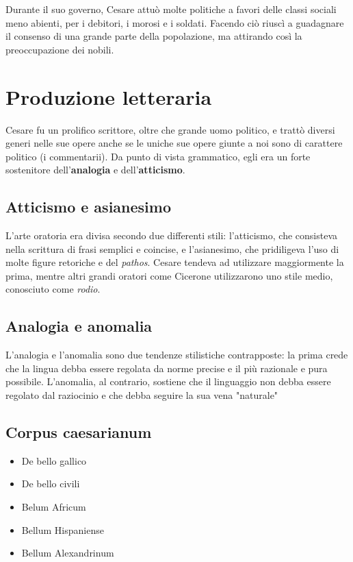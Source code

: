 \documentclass[10pt,a4paper]{article}
\begin{document}
Durante il suo governo, Cesare attuò molte politiche a favori delle classi sociali meno abienti, per i debitori, i morosi e i soldati. Facendo ciò riuscì a guadagnare il consenso di una grande parte della popolazione, ma attirando così la preoccupazione dei nobili.

\section{Produzione letteraria}

Cesare fu un prolifico scrittore, oltre che grande uomo politico, e trattò diversi generi nelle sue opere anche se le uniche sue opere giunte a noi sono di carattere politico (i commentarii). Da punto di vista grammatico, egli era un forte sostenitore dell'\textbf{analogia} e dell'\textbf{atticismo}.

\subsection{Atticismo e asianesimo}

L'arte oratoria era divisa secondo due differenti stili: l'atticismo, che consisteva nella scrittura di frasi semplici e coincise, e l'asianesimo, che pridiligeva l'uso di molte figure retoriche e del \textit{pathos}. Cesare tendeva ad utilizzare maggiormente la prima, mentre altri grandi oratori come Cicerone utilizzarono uno stile medio, conosciuto come \textit{rodio}.

\subsection{Analogia e anomalia}

L'analogia e l'anomalia sono due tendenze stilistiche contrapposte: la prima crede che la lingua debba essere regolata da norme precise e il più razionale e pura possibile. L'anomalia, al contrario, sostiene che il linguaggio non debba essere regolato dal raziocinio e che debba seguire la sua vena "naturale"

\subsection{Corpus caesarianum}

\begin{itemize}
	\item De bello gallico
	\item De bello civili
	\item Belum Africum
	\item Bellum Hispaniense
	\item Bellum Alexandrinum
\end{itemize}
\end{document}
